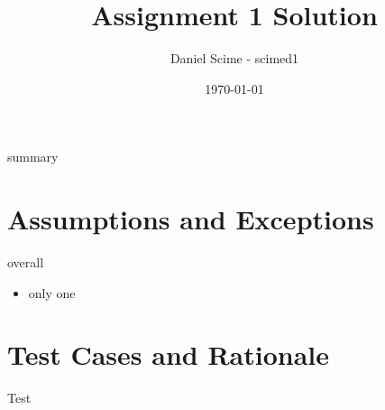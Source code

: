 \documentclass[12pt]{article}
\title{Assignment 1 Solution}
\author{Daniel Scime - scimed1}
\date{\today}
\begin{document}
\maketitle

summary

\section{Assumptions and Exceptions} \label{AssumptAndExcept}
overall

\begin{itemize}
\item only one
\end{itemize}

\section{Test Cases and Rationale} \label{Testing}
Test
\end{document}
